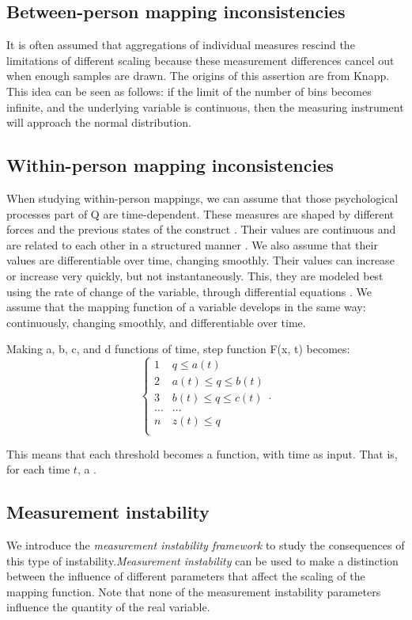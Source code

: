 \documentclass[utf8]{FrontiersinVancouver}
\begin{document}
\subsection{Between-person mapping inconsistencies}
It is often assumed that aggregations of individual measures rescind the limitations of different scaling because these measurement differences cancel out when enough samples are drawn. The origins of this assertion are from Knapp. This idea can be seen as follows: if the limit of the number of bins becomes infinite, and the underlying variable is continuous, then the measuring instrument will approach the normal distribution. 

\subsection{Within-person mapping inconsistencies}
When studying within-person mappings, we can assume that those psychological processes part of Q are time-dependent. These measures are shaped by different forces and the previous states of the construct \citep{olthofComplexityPsychologicalSelfratings2020b}. Their values are continuous and are related to each other in a structured manner \citep{bokerConsequencesContinuityHunt2002}. We also assume that their values are differentiable over time, changing smoothly. Their values can increase or increase very quickly, but not instantaneously. This, they are modeled best using the rate of change of the variable, through differential equations \citep{molenaarNewPersonSpecificParadigm2009}. We assume that the mapping function of a variable develops in the same way: continuously, changing smoothly, and differentiable over time.

Making a, b, c, and d functions of time, step function F(x, t) becomes: 
\[
\begin{cases} 
    1 & q \leq a(t)\\
    2 & a(t) \leq q \leq b(t)\\
    3 & b(t) \leq q \leq c(t)\\
    \ldots & \ldots\\    
    n & z(t) \leq q\\
\end{cases}.
\]

This means that each threshold becomes a function, with time as input. That is, for each time $t$, a . 

\subsection{Measurement instability}
We introduce the \textit{measurement instability framework} to study the consequences of this type of instability.\textit{Measurement instability} can be used to make a distinction between the influence of different parameters that affect the scaling of the mapping function. Note that none of the measurement instability parameters influence the quantity of the real variable. 
\end{document}
